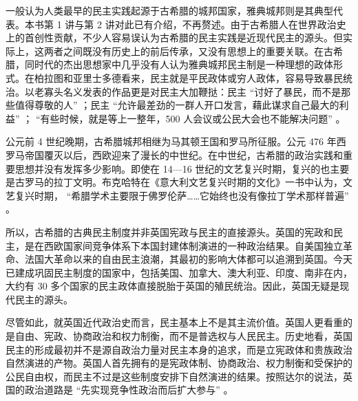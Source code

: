 一般认为人类最早的民主实践起源于古希腊的城邦国家，雅典城邦则是其典型代表。本书第 1 讲与第 2 讲对此已有介绍，不再赘述。由于古希腊人在世界政治史上的首创性贡献，不少人容易误认为古希腊的民主实践是近现代民主的源头。但实际上，这两者之间既没有历史上的前后传承，又没有思想上的重要关联。在古希腊，同时代的杰出思想家中几乎没有人认为雅典城邦民主制是一种理想的政体形式。在柏拉图和亚里士多德看来，民主就是平民政体或穷人政体，容易导致暴民统治。以老寡头名义发表的作品更是对民主大加鞭挞：民主 “讨好了暴民，而不是那些值得尊敬的人” ；民主 “允许最差劲的一群人开口发言，藉此谋求自己最大的利益” ； “有些时候，就是等上一整年，500 人会议或公民大会也不能解决问题” 。

公元前 4 世纪晚期，古希腊城邦相继为马其顿王国和罗马所征服。公元 476 年西罗马帝国覆灭以后，西欧迎来了漫长的中世纪。在中世纪，古希腊的政治实践和重要思想并没有发挥多少影响。即使在 14—16 世纪的文艺复兴时期，复兴的也主要是古罗马的拉丁文明。布克哈特在《意大利文艺复兴时期的文化》一书中认为，文艺复兴时期， “希腊学术主要限于佛罗伦萨……它始终也没有像拉丁学术那样普遍” 。

所以，古希腊的古典民主制度并非英国宪政与民主的直接源头。英国的宪政和民主，是在西欧国家间竞争体系下本国封建体制演进的一种政治结果。自美国独立革命、法国大革命以来的自由民主浪潮，其最初的影响大体都可以追溯到英国。今天已建成巩固民主制度的国家中，包括美国、加拿大、澳大利亚、印度、南非在内，大约有 30 多个国家的民主政体直接脱胎于英国的殖民统治。因此，英国无疑是现代民主的源头。

尽管如此，就英国近代政治史而言，民主基本上不是其主流价值。英国人更看重的是自由、宪政、协商政治和权力制衡，而不是普选权与人民民主。历史地看，英国民主的形成最初并不是源自政治力量对民主本身的追求，而是立宪政体和贵族政治自然演进的产物。英国人首先拥有的是宪政体制、协商政治、权力制衡和受保护的公民自由权，而民主不过是这些制度安排下自然演进的结果。按照达尔的说法，英国的政治道路是 “先实现竞争性政治而后扩大参与” 。

